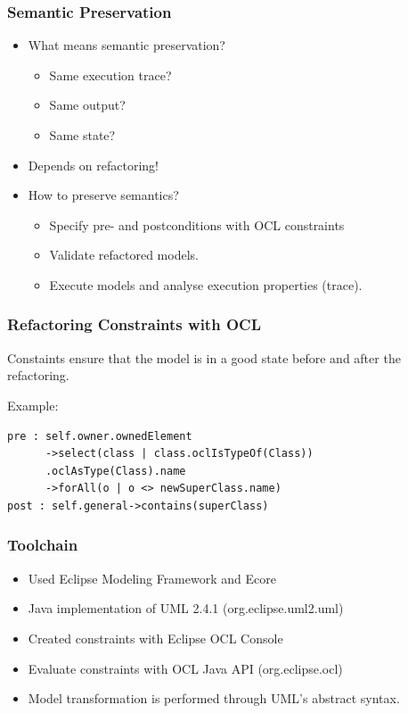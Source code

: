 \documentclass{beamer}
\begin{document}
        
\begin{frame}
\frametitle{Semantic Preservation}
\begin{itemize}
 \item What means semantic preservation?
 \begin{itemize}
  \item Same execution trace?
  \item Same output?
  \item Same state?
 \end{itemize}
 \item Depends on refactoring!
 \item How to preserve semantics?
 \begin{itemize}
  \item Specify pre- and postconditions with OCL constraints
  \item Validate refactored models.
  \item Execute models and analyse execution properties (trace).
 \end{itemize}
\end{itemize}

\end{frame}
        
\begin{frame}[fragile]
\frametitle{Refactoring Constraints with OCL}
Constaints ensure that the model is in a good state
before and after the refactoring.

Example:
\begin{lstlisting}
pre : self.owner.ownedElement
      ->select(class | class.oclIsTypeOf(Class))
      .oclAsType(Class).name
      ->forAll(o | o <> newSuperClass.name)
post : self.general->contains(superClass)
\end{lstlisting}

\end{frame}
        
\begin{frame}
\frametitle{Toolchain}
\begin{itemize}
 \item Used Eclipse Modeling Framework and Ecore
 \item Java implementation of UML 2.4.1 (org.eclipse.uml2.uml)
 \item Created constraints with Eclipse OCL Console
 \item Evaluate constraints with OCL Java API (org.eclipse.ocl)
 \item Model transformation is performed through UML's abstract syntax.
\end{itemize}
\end{frame}
\end{document}
